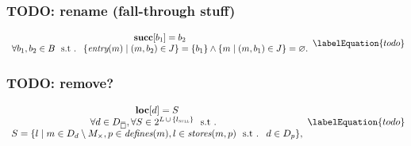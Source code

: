 \subsubsection{TODO: rename (fall-through stuff)}



\begin{equation}
  \begin{array}{c}
    \mVar{succ}[b_1] = b_2 \\
    \forall b_1, b_2 \in \mBlockSet
    \text{ \st }
    \mSetBuilder{\mEntry(m)}{\mPair{m}{b_2} \in \mFallThroughSet} = \mSet{b_1}
    \mAnd
    \mSetBuilder{m}{\mPair{m}{b_1} \in \mFallThroughSet} = \mEmptySet.
  \end{array}
  \labelEquation{todo}
\end{equation}



\subsubsection{TODO: remove?}


\begin{equation}
  \begin{array}{c}
    \mVar{loc}[d] = S \\
    \forall d \in \mStateDataCompSet,
    \forall S \in
      \mPowerset{\mLocationSet \, \cup \, \mSet{\mNullLocation}} \text{ \st} \\
    S = \mSetBuilder{l}%
                    {%
                      m \in \mDataSet[d] \setminus \mKillMatchSet,
                      p \in \mDefines(m),
                      l \in \mStores(m, p)
                      \text{ \st }
                      d \in \mDataSet[p]
                    },
  \end{array}
  \labelEquation{todo}
\end{equation}



